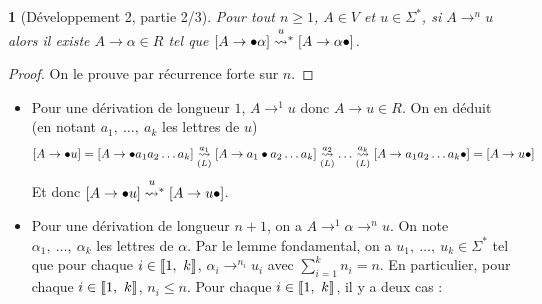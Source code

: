 \documentclass[11pt,a4paper]{article}
\theoremstyle{plain}
\theoremstyle{definition}
\theoremstyle{definition}
\theoremstyle{remark}
\theoremstyle{remark}
\theoremstyle{plain}
\newtheorem{lem}[thm]{\protect\lemmaname}
\theoremstyle{plain}
\theoremstyle{plain}
\theoremstyle{remark}
\providecommand{\lemmaname}{Lemme}
\begin{document}
\begin{lem}[Développement 2, partie 2/3]
	Pour tout $n\ge1$, $A\in V$ et $u\in\Sigma^{*}$, si $A\to^{n}u$
	alors il existe $A\to\alpha\in R$ tel que $\left[A\to\bullet\alpha\right]\transitionn u*\left[A\to\alpha\bullet\right]$.\label{lem:regle}\end{lem}
\begin{proof}
	On le prouve par récurrence forte sur $n$.\end{proof}
\begin{itemize}
	\item Pour une dérivation de longueur $1$, $A\to^{1}u$ donc $A\to u\in R$.
	On en déduit (en notant $a_{1},\ \dots,\ a_{k}$ les lettres de $u$)
	\[
	\left[A\to\bullet u\right]=\left[A\to\bullet a_{1}a_{2}\dots a_{k}\right]\underset{(L)}{\overset{a_{1}}{\leadsto}}\left[A\to a_{1}\bullet a_{2}\dots a_{k}\right]\underset{(L)}{\overset{a_{2}}{\leadsto}}\dots\underset{(L)}{\overset{a_{k}}{\leadsto}}\left[A\to a_{1}a_{2}\dots a_{k}\bullet\right]=\left[A\to u\bullet\right]
	\]
	Et donc $\left[A\to\bullet u\right]\transitionn u*\left[A\to u\bullet\right]$.
	\item Pour une dérivation de longueur $n+1$, on a $A\to^{1}\alpha\to^{n}u$.
	On note $\alpha_{1},\ \dots,\ \alpha_{k}$ les lettres de $\alpha$.
	Par le lemme fondamental, on a $u_{1},\ \dots,\ u_{k}\in\Sigma^{*}$
	tel que pour chaque $i\in\left\llbracket 1,\ k\right\rrbracket$, $\alpha_{i}\to^{n_{i}}u_{i}$
	avec ${\displaystyle \sum_{i=1}^{k}}n_{i}=n$. En particulier, pour
	chaque $i\in\left\llbracket 1,\ k\right\rrbracket$, $n_{i}\le n$. Pour chaque $i\in\left\llbracket 1,\ k\right\rrbracket$,
	il y a deux cas :
	

\end{itemize}
\end{document}
